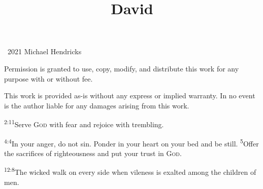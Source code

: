 \documentclass[openany,12pt,english]{book}
\title{David}
\author{}
\date{}
\newenvironment{para}{\par\pretolerance=100\tolerance=200\setlength{\emergencystretch}{0.6em}\relax}{\par}
\begin{document}
\maketitle

{
\thispagestyle{empty}
\vspace*{\fill}
\begin{changemargin}{.8in}{.8in}
\begin{center}
\textcopyright{}~2021 Michael Hendricks

\vspace{0.5\baselineskip}

Permission is granted to use, copy, modify, and distribute
this work for any purpose with or without fee.

\vspace{0.5\baselineskip}

This work is provided as-is without any express or implied
warranty. In no event is the author liable for any damages
arising from this work.
\end{center}
\end{changemargin}
}
\clearpage{}

\clearpage{}

\markboth{}{}


\begin{para}
    \textsuperscript{2:11}\thinspace{}Serve \textsc{God} with fear and re\-joice with trem\-bling.
\end{para}

\begin{para}
    \textsuperscript{4:4}\thinspace{}In your an\-ger, do not sin. Pon\-der in your heart on your bed and be still.
    \textsuperscript{5}\thinspace{}Of\-fer the sacrifices of right\-eous\-ness and put your trust in \textsc{God}.
\end{para}

\begin{para}
    \textsuperscript{12:8}\thinspace{}The wick\-ed walk on eve\-ry side when vile\-ness is ex\-alt\-ed a\-mong the chil\-dren of men.
\end{para}
\end{document}
